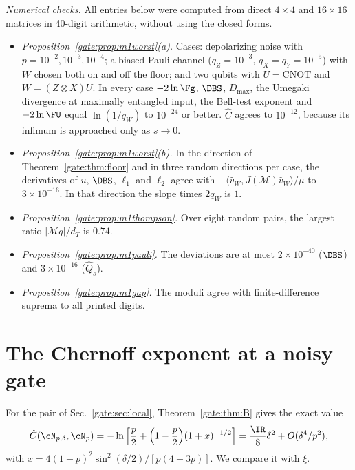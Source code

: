 \emph{Numerical checks.} All entries below were computed from direct $4\times4$ and $16\times16$ matrices in 40-digit arithmetic, without using the closed forms.
\begin{itemize}
\item \emph{Proposition~\ref{gate:prop:m1worst}(a).} Cases: depolarizing noise with $p=10^{-2},10^{-3},10^{-4}$; a biased Pauli channel ($q_Z=10^{-3}$, $q_X=q_Y=10^{-5}$) with $W$ chosen both on and off the floor; and two qubits with $U=\mathrm{CNOT}$ and $W=(Z\otimes X)U$. In every case $-2\ln\Fg$, $\DBS$, $D_{\max}$, the Umegaki divergence at maximally entangled input, the Bell-test exponent and $-2\ln\FU$ equal $\ln(1/q_W)$ to $10^{-24}$ or better. $\hat C$ agrees to $10^{-12}$, because its infimum is approached only as $s\to0$.
\item \emph{Proposition~\ref{gate:prop:m1worst}(b).} In the direction of Theorem~\ref{gate:thm:floor} and in three random directions per case, the derivatives of $u$, $\DBS$, $\ell_1$ and $\ell_2$ agree with $-\langle\hat v_W,J(\mathcal M)\hat v_W\rangle/\mu$ to $3\times10^{-16}$. In that direction the slope times $2q_W$ is $1$.
\item \emph{Proposition~\ref{gate:prop:m1thompson}.} Over eight random pairs, the largest ratio $|\mathcal M q|/d_T$ is $0.74$.
\item \emph{Proposition~\ref{gate:prop:m1pauli}.} The deviations are at most $2\times10^{-40}$ ($\DBS$) and $3\times10^{-16}$ ($\hat Q_s$).
\item \emph{Proposition~\ref{gate:prop:m1gap}.} The moduli agree with finite-difference suprema to all printed digits.
\end{itemize}

\section{The Chernoff exponent at a noisy gate}\label{gate:sec:m1chernoff}

For the pair of Sec.~\ref{gate:sec:local}, Theorem~\ref{gate:thm:B} gives the exact value
\begin{equation}\label{gate:eq:m1C}
\hat C(\cN_{p,\delta},\cN_p)=-\ln\Big[\frac p2+\Big(1-\frac p2\Big)(1+x)^{-1/2}\Big]=\frac{\IR}{8}\delta^2+O(\delta^4/p^2),
\end{equation}
with $x=4(1-p)^2\sin^2(\delta/2)/[p(4-3p)]$. We compare it with $\xi$.

